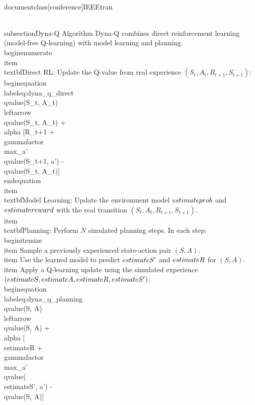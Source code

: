 \\documentclass[conference]{IEEEtran}
\begin{document}
\\subsection{Dyna-Q Algorithm}
Dyna-Q \cite{sutton1990integrated} combines direct reinforcement learning (model-free Q-learning) with model learning and planning.
\\begin{enumerate}
    \\item \\textbf{Direct RL}: Update the Q-value from real experience $(S_t, A_t, R_{t+1}, S_{t+1})$:
    \\begin{equation}
    \\label{eq:dyna_q_direct}
    \\qvalue(S_t, A_t) \\leftarrow \\qvalue(S_t, A_t) + \\alpha [R_{t+1} + \\gammafactor \\max_{a'} \\qvalue(S_{t+1}, a') - \\qvalue(S_t, A_t)]
    \\end{equation}
    \\item \\textbf{Model Learning}: Update the environment model $\\estimate{\\prob}$ and $\\estimate{\\reward}$ with the real transition $(S_t, A_t, R_{t+1}, S_{t+1})$.
    \\item \\textbf{Planning}: Perform $N$ simulated planning steps. In each step:
    \\begin{itemize}
        \\item Sample a previously experienced state-action pair $(S, A)$.
        \\item Use the learned model to predict $\\estimate{S'}$ and $\\estimate{R}$ for $(S, A)$.
        \\item Apply a Q-learning update using the simulated experience $(\\estimate{S}, \\estimate{A}, \\estimate{R}, \\estimate{S'})$:
        \\begin{equation}
        \\label{eq:dyna_q_planning}
        \\qvalue(S, A) \\leftarrow \\qvalue(S, A) + \\alpha [\\estimate{R} + \\gammafactor \\max_{a'} \\qvalue(\\estimate{S'}, a') - \\qvalue(S, A)]
\end{document}
